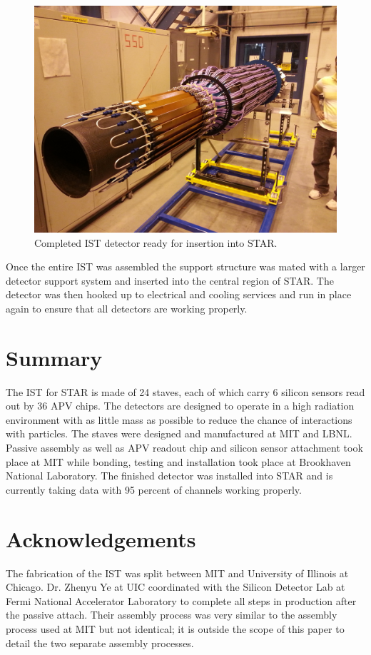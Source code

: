 \documentclass[preprint,12pt]{elsarticle}
\begin{document}
\begin{figure}[h]
\begin{center}
\includegraphics[width=5in, keepaspectratio=true, angle=0]{graphics/full.jpg}
\caption{Completed IST detector ready for insertion into STAR.
\label{fig:full}}
\end{center}
\end{figure}
%
Once the entire IST was assembled the support structure was mated with a
larger detector support system and inserted into the central region of STAR.
The detector was then hooked up to electrical and cooling services and run in
place again to ensure that all detectors are working properly.

\section{Summary}
The IST for STAR is made of 24 staves, each of which carry 6 silicon sensors read
out by 36 APV chips. The detectors are designed to operate in a high radiation
environment with as little mass as possible to reduce the chance of interactions
with particles. The staves were designed and manufactured at MIT and LBNL.
Passive assembly as well as APV readout chip and silicon sensor attachment took
place at MIT while bonding, testing and installation took place at Brookhaven
National Laboratory. The finished detector was installed into STAR and is
currently taking data with 95 percent of channels working properly.

\section{Acknowledgements}
The fabrication of the IST was split between MIT and University of Illinois at Chicago.
Dr. Zhenyu Ye at UIC coordinated with the Silicon Detector Lab at Fermi National
Accelerator Laboratory to complete all steps in production after the passive
attach.  Their assembly process was very similar to the assembly process used
at MIT but not identical; it is outside the scope of this paper to detail the
two separate assembly processes.
\end{document}
